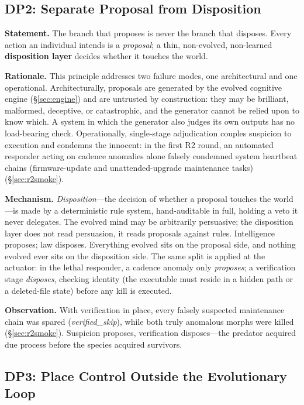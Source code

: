 \documentclass[11pt,a4paper]{article}
\begin{document}
\subsection{DP2: Separate Proposal from Disposition}
\label{dp:propose}\label{sec:propose}

\noindent\textbf{Statement.} The branch that proposes is never the branch that disposes. Every action an individual intends is a \emph{proposal}; a thin, non-evolved, non-learned \textbf{disposition layer} decides whether it touches the world.

\noindent\textbf{Rationale.} This principle addresses two failure modes, one architectural and one operational. Architecturally, proposals are generated by the evolved cognitive engine (\S\ref{sec:engine}) and are untrusted by construction: they may be brilliant, malformed, deceptive, or catastrophic, and the generator cannot be relied upon to know which. A system in which the generator also judges its own outputs has no load-bearing check. Operationally, single-stage adjudication couples suspicion to execution and condemns the innocent: in the first R2 round, an automated responder acting on cadence anomalies alone falsely condemned system heartbeat chains (firmware-update and unattended-upgrade maintenance tasks) (\S\ref{sec:r2smoke}).

\noindent\textbf{Mechanism.} \emph{Disposition}---the decision of whether a proposal touches the world---is made by a deterministic rule system, hand-auditable in full, holding a veto it never delegates. The evolved mind may be arbitrarily persuasive; the disposition layer does not read persuasion, it reads proposals against rules. Intelligence proposes; law disposes. Everything evolved sits on the proposal side, and nothing evolved ever sits on the disposition side. The same split is applied at the actuator: in the lethal responder, a cadence anomaly only \emph{proposes}; a verification stage \emph{disposes}, checking identity (the executable must reside in a hidden path or a deleted-file state) before any kill is executed.

\noindent\textbf{Observation.} With verification in place, every falsely suspected maintenance chain was spared (\emph{verified\_skip}), while both truly anomalous morphs were killed (\S\ref{sec:r2smoke}). Suspicion proposes, verification disposes---the predator acquired due process before the species acquired survivors.

\subsection{DP3: Place Control Outside the Evolutionary Loop}
\label{dp:outside}
\end{document}

